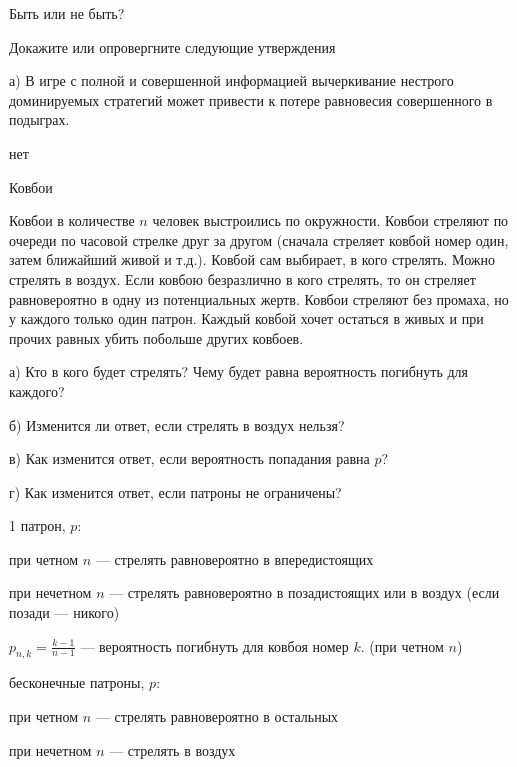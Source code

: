 \begin{problem}
 Быть или не быть?\par
Докажите или опровергните следующие утверждения\par
а) В игре с полной и совершенной информацией вычеркивание нестрого доминируемых стратегий может привести к потере равновесия совершенного в подыграх.



\begin{sol}
нет
\end{sol}
\end{problem}



\begin{problem}
 Ковбои \par %
Ковбои в количестве $n$ человек выстроились по окружности. Ковбои стреляют по очереди по часовой стрелке друг за другом (сначала стреляет ковбой номер один, затем ближайший живой и т.д.). Ковбой сам выбирает, в кого стрелять. Можно стрелять в воздух. Если ковбою безразлично в кого стрелять, то он стреляет равновероятно в одну из потенциальных жертв. Ковбои стреляют без промаха, но у каждого только один патрон. Каждый ковбой хочет остаться в живых и при прочих равных убить побольше других ковбоев.\par
а) Кто в кого будет стрелять? Чему будет равна вероятность погибнуть для каждого? \par
б) Изменится ли ответ, если стрелять в воздух нельзя? \par
в) Как изменится ответ, если вероятность попадания равна $p$? \par
г) Как изменится ответ, если патроны не ограничены?



\begin{sol}

1 патрон, $p$: \par
при четном $n$ — стрелять равновероятно в впередистоящих \par
при нечетном $n$ — стрелять равновероятно в позадистоящих или в воздух (если позади — никого) \par
$p_{n,k}=\frac{k-1}{n-1}$ — вероятность погибнуть для ковбоя номер $k$. (при четном $n$) \par
бесконечные патроны, $p$: \par
при четном $n$ — стрелять равновероятно в остальных \par
при нечетном $n$ — стрелять в воздух
\end{sol}
\end{problem}



